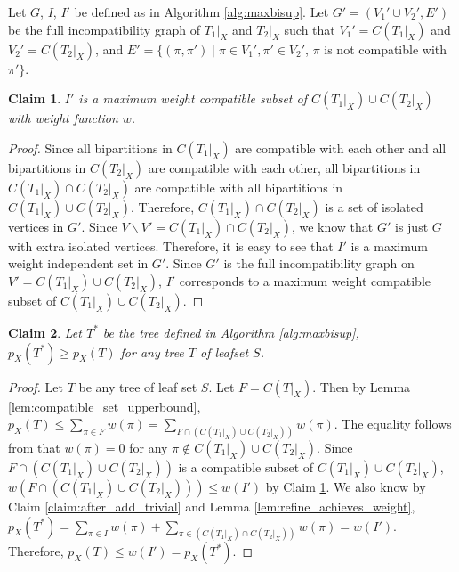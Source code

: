 \documentclass{bmcart}
\newtheorem{claim}{Claim}
\begin{document}
Let $G$, $I$, $I'$ be defined as in Algorithm \ref{alg:maxbisup}. Let $G'= (V_1' \cup V_2',E')$ be the full incompatibility graph of $T_1|_X$ and $T_2|_X$ such that $V_1' = C(T_1|_X)$ and $V_2' = C(T_2|_X)$, and $E' = \{(\pi, \pi') \mid \pi \in V_1', \pi' \in V_2'$, $\pi$ is not compatible with $\pi'\}$. 


\begin{claim}\label{claim:max_compatible_subset}
    $I'$ is a maximum weight compatible subset of $C(T_1|_X) \cup C(T_2|_X)$ with weight function $w$. 
\end{claim}
\begin{proof}
    Since all bipartitions in $C(T_1|_X)$ are compatible with each other and all bipartitions in $C(T_2|_X)$ are compatible with each other, all bipartitions in $C(T_1|_X) \cap C(T_2|_X)$ are compatible with all bipartitions in $C(T_1|_X) \cup C(T_2|_X)$. Therefore, $C(T_1|_X) \cap C(T_2|_X)$ is a set of isolated vertices in $G'$. Since $V \backslash V' = C(T_1|_X) \cap C(T_2|_X)$, we know that $G'$ is just $G$ with extra isolated vertices. Therefore, it is easy to see that $I'$ is a maximum weight independent set in $G'$. Since $G'$ is the full incompatibility graph on $V' = C(T_1|_X) \cup C(T_2|_X)$, $I'$ corresponds to a maximum weight compatible subset of $C(T_1|_X) \cup C(T_2|_X)$.
\end{proof}

\begin{claim}\label{claim:after_add_all_bipars}
    Let $T^*$ be the tree defined in Algorithm \ref{alg:maxbisup}, $p_X(T^*) \ge p_X(T)$ for any tree $T$ of leafset $S$.
\end{claim}
\begin{proof}
Let $T$ be any tree of leaf set $S$. Let $F = C(T|_X)$. Then by Lemma \ref{lem:compatible_set_upperbound}, $p_X(T) \le \sum_{\pi \in F} w(\pi) = \sum_{F \cap (C(T_1|_X) \cup C(T_2|_X))} w(\pi)$. The equality follows from that $w(\pi) = 0$ for any $\pi \notin C(T_1|_X) \cup C(T_2|_X)$. Since $F \cap (C(T_1|_X) \cup C(T_2|_X))$ is a compatible subset of $C(T_1|_X) \cup C(T_2|_X)$, $w(F \cap (C(T_1|_X) \cup C(T_2|_X))) \le w(I')$ by Claim \ref{claim:max_compatible_subset}. We also know by Claim \ref{claim:after_add_trivial} and Lemma \ref{lem:refine_achieves_weight}, $p_X(T^*)= \sum_{\pi \in I} w(\pi) + \sum_{\pi \in (C(T_1|_X )\cap C(T_2|_X))} w(\pi) = w(I')$. Therefore, $p_X(T) \le w(I') = p_X(T^*)$.  
\end{proof}
\end{document}
